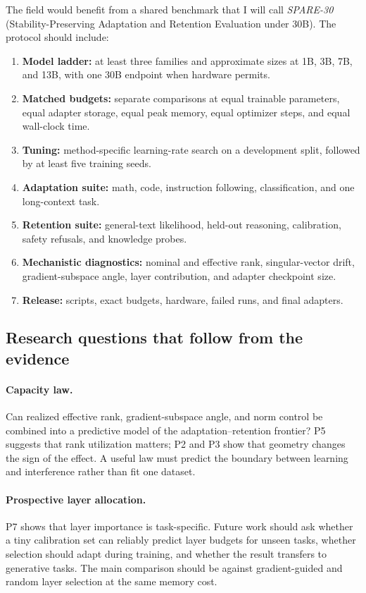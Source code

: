 \documentclass[11pt]{article}
\begin{document}
The field would benefit from a shared benchmark that I will call \emph{SPARE-30} (Stability-Preserving Adaptation and Retention Evaluation under 30B). The protocol should include:
\begin{enumerate}
  \item \textbf{Model ladder:} at least three families and approximate sizes at 1B, 3B, 7B, and 13B, with one 30B endpoint when hardware permits.
  \item \textbf{Matched budgets:} separate comparisons at equal trainable parameters, equal adapter storage, equal peak memory, equal optimizer steps, and equal wall-clock time.
  \item \textbf{Tuning:} method-specific learning-rate search on a development split, followed by at least five training seeds.
  \item \textbf{Adaptation suite:} math, code, instruction following, classification, and one long-context task.
  \item \textbf{Retention suite:} general-text likelihood, held-out reasoning, calibration, safety refusals, and knowledge probes.
  \item \textbf{Mechanistic diagnostics:} nominal and effective rank, singular-vector drift, gradient-subspace angle, layer contribution, and adapter checkpoint size.
  \item \textbf{Release:} scripts, exact budgets, hardware, failed runs, and final adapters.
\end{enumerate}

\subsection{Research questions that follow from the evidence}

\paragraph{Capacity law.}
Can realized effective rank, gradient-subspace angle, and norm control be combined into a predictive model of the adaptation--retention frontier? P5 suggests that rank utilization matters; P2 and P3 show that geometry changes the sign of the effect. A useful law must predict the boundary between learning and interference rather than fit one dataset.

\paragraph{Prospective layer allocation.}
P7 shows that layer importance is task-specific. Future work should ask whether a tiny calibration set can reliably predict layer budgets for unseen tasks, whether selection should adapt during training, and whether the result transfers to generative tasks. The main comparison should be against gradient-guided and random layer selection at the same memory cost.
\end{document}
